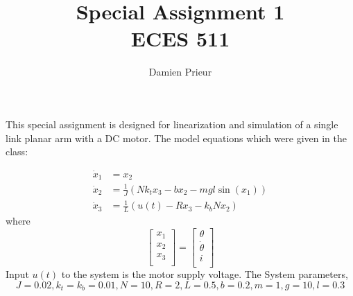 \documentclass{article}
\author{Damien Prieur}
\title{Special Assignment 1 \\ ECES 511}
\date{}
\begin{document}
\maketitle

This special assignment is designed for linearization and simulation of a single link planar arm with a DC motor.
The model equations which were given in the class:

\begin{align}
\dot{x}_1 &= x_2 \nonumber \\
\dot{x}_2 &= \frac{1}{J}(Nk_tx_3 - bx_2 - mgl\sin(x_1) ) \nonumber \\
\dot{x}_3 &= \frac{1}{L}(u(t) - Rx_3 - k_bNx_2) \nonumber
\end{align}
where
$$
\begin{bmatrix}
x_1 \\
x_2 \\
x_3 \\
\end{bmatrix}
=
\begin{bmatrix}
\theta \\
\dot{\theta} \\
i \\
\end{bmatrix}
$$
\newline
Input $u(t)$ to the system is the motor supply voltage.
\newline
\newline
The System parameters,
$$
J = 0.02,
k_t = k_b = 0.01,
N = 10,
R = 2,
L = 0.5,
b = 0.2,
m = 1,
g = 10,
l = 0.3
$$
\end{document}
